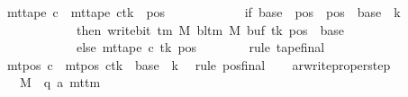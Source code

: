 \begin{isabellebody}
\ {\isachardoublequoteopen}mt{\isacharunderscore}{\kern0pt}tape\ c{}\ {\isacharequal}{\kern0pt}\ {\isacharparenleft}{\kern0pt}mt{\isacharunderscore}{\kern0pt}tape\ c{\isacharprime}{\kern0pt}{\isacharparenright}{\kern0pt}{\isacharparenleft}{\kern0pt}tk\ {\isacharcolon}{\kern0pt}{\isacharequal}{\kern0pt}\ {\isacharparenleft}{\kern0pt}{\isasymlambda}pos{\isachardot}{\kern0pt}\isanewline
\ \ \ \ \ \ \ \ \ \ \ \ if\ base\ {\isasymle}\ pos\ {\isasymand}\ pos\ {\isacharless}{\kern0pt}\ base\ {\isacharplus}{\kern0pt}\ {\isacharquery}{\kern0pt}k\isanewline
\ \ \ \ \ \ \ \ \ \ \ \ then\ write{\isacharunderscore}{\kern0pt}bit\ {\isacharparenleft}{\kern0pt}{\isasymGamma}{\isacharunderscore}{\kern0pt}tm\ M{\isacharparenright}{\kern0pt}\ {\isacharparenleft}{\kern0pt}bl{\isacharunderscore}{\kern0pt}tm\ M{\isacharparenright}{\kern0pt}\ {\isacharparenleft}{\kern0pt}buf\ tk{\isacharparenright}{\kern0pt}\ {\isacharparenleft}{\kern0pt}pos\ {\isacharminus}{\kern0pt}\ base{\isacharparenright}{\kern0pt}\isanewline
\ \ \ \ \ \ \ \ \ \ \ \ else\ mt{\isacharunderscore}{\kern0pt}tape\ c{\isacharprime}{\kern0pt}\ tk\ pos{\isacharparenright}{\kern0pt}{\isacharparenright}{\kern0pt}{\isachardoublequoteclose}\isanewline
\ \ \ \ \ \ \isamarkupfalse%
\ {\isacharparenleft}{\kern0pt}rule\ tape{\isacharunderscore}{\kern0pt}final{\isacharparenright}{\kern0pt}\isanewline
\ \ \ \ \isamarkupfalse%
\ {\isachardoublequoteopen}mt{\isacharunderscore}{\kern0pt}pos\ c{}\ {\isacharequal}{\kern0pt}\ {\isacharparenleft}{\kern0pt}mt{\isacharunderscore}{\kern0pt}pos\ c{\isacharprime}{\kern0pt}{\isacharparenright}{\kern0pt}{\isacharparenleft}{\kern0pt}tk\ {\isacharcolon}{\kern0pt}{\isacharequal}{\kern0pt}\ base\ {\isacharplus}{\kern0pt}\ {\isacharquery}{\kern0pt}k{\isacharparenright}{\kern0pt}{\isachardoublequoteclose}\ \isamarkupfalse%
\ {\isacharparenleft}{\kern0pt}rule\ pos{\isacharunderscore}{\kern0pt}final{\isacharparenright}{\kern0pt}\isanewline
\ \ \isamarkupfalse%
\isanewline
{}\isamarkupfalse%
%
\endisatagproof
{\isafoldproof}%
%
\isadelimproof
\isanewline
%
\endisadelimproof
\isanewline
{}\isamarkupfalse%
\ ar{\isacharunderscore}{\kern0pt}write{\isacharunderscore}{\kern0pt}proper{\isacharunderscore}{\kern0pt}step{\isacharcolon}{\kern0pt}\isanewline
\ \ \ M\ {\isacharcolon}{\kern0pt}{\isacharcolon}{\kern0pt}\ {\isachardoublequoteopen}{\isacharparenleft}{\kern0pt}{\isacharprime}{\kern0pt}q{\isacharcomma}{\kern0pt}\ {\isacharprime}{\kern0pt}a{\isacharparenright}{\kern0pt}\ mttm{\isachardoublequoteclose}\isanewline

\end{isabellebody}
